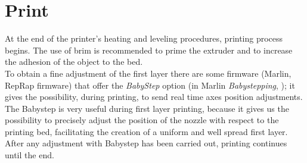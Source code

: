 \section{Print}
At the end of the printer's heating and leveling procedures, printing process begins. The use of brim is recommended to prime the extruder and to increase the adhesion of the object to the bed.\\
To obtain a fine adjustment of the first layer there are some firmware (Marlin, RepRap firmware) that offer the \emph{BabyStep} option (in Marlin \emph{Babystepping}, \parencite{Reference152}); it gives the possibility, during printing, to send real time axes position adjustments. The Babystep is very useful during first layer printing, because it gives us the possibility to precisely adjust the position of the nozzle with respect to the printing bed, facilitating the creation of a uniform and well spread first layer. After any adjustment with Babystep has been carried out, printing continues until the end.
